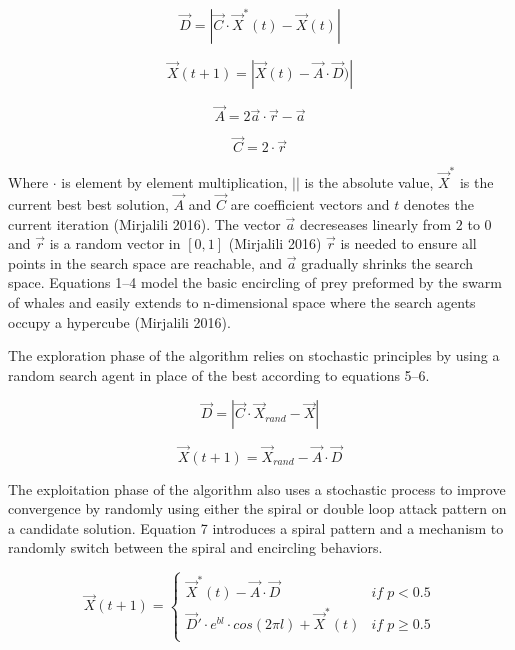 \documentclass[11pt]{article}
\begin{document}
\begin{equation}
	\vec{D} = |\vec{C}\cdot\vec{X}^*(t) - \vec{X}(t)|
\end{equation}

\begin{equation}
	\vec{X}(t + 1) = |\vec{X}(t) - \vec{A}\cdot\vec{D})|
\end{equation}

\begin{equation}
	\vec{A} = 2\vec{a}\cdot\vec{r}-\vec{a}
\end{equation}

\begin{equation}
	\vec{C} = 2\cdot\vec{r}
\end{equation}

Where $\cdot$ is element by element multiplication, $| |$ is the absolute value, $\vec{X}^*$ is the current best best solution, $\vec{A}$ and $\vec{C}$ are coefficient vectors and $t$ denotes the current iteration (Mirjalili 2016).
The vector $\vec{a}$ decreseases linearly from $2$ to $0$ and $\vec{r}$ is a random vector in $[0,1]$ (Mirjalili 2016) $\vec{r}$ is needed to ensure all points in the search space are reachable, and $\vec{a}$ gradually shrinks the search space.
Equations 1--4 model the basic encircling of prey preformed by the swarm of whales and easily extends to n-dimensional space where the search agents occupy a hypercube (Mirjalili 2016).

The exploration phase of the algorithm relies on stochastic principles by using a random search agent in place of the best according to equations 5--6.

\begin{equation}
	\vec{D} = |\vec{C}\cdot\vec{X}_{rand} - \vec{X}|
\end{equation}

\begin{equation}
	\vec{X}(t+1) = \vec{X}_{rand} - \vec{A}\cdot\vec{D}
\end{equation}

The exploitation phase of the algorithm also uses a stochastic process to improve convergence by randomly using either the spiral or double loop attack pattern on a candidate solution.
Equation 7 introduces a spiral pattern and a mechanism to randomly switch between the spiral and encircling behaviors.

\begin{equation}
	\vec{X}(t+1) =
	\begin{cases}
		\vec{X}^*(t) - \vec{A}\cdot\vec{D} &if \; p < 0.5\\
		\vec{D}'\cdot e^{bl} \cdot cos(2\pi l) + \vec{X}^*(t) &if \; p \geq 0.5\\
   \end{cases}
\end{equation}
\end{document}
